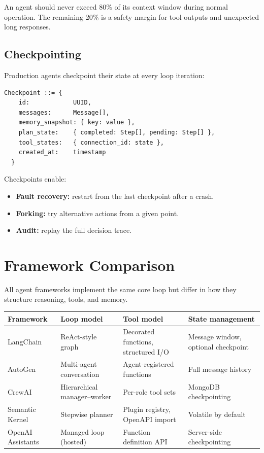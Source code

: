 \begin{principle}
	An agent should never exceed 80\% of its context window during normal operation. The remaining 20\% is a safety margin for tool outputs and unexpected long responses.
\end{principle}

\subsection{Checkpointing}

Production agents checkpoint their state at every loop iteration:

\begin{lstlisting}[caption=Agent checkpoint structure]
  Checkpoint ::= {
    id:            UUID,
    messages:      Message[],
    memory_snapshot: { key: value },
    plan_state:    { completed: Step[], pending: Step[] },
    tool_states:   { connection_id: state },
    created_at:    timestamp
  }
\end{lstlisting}

Checkpoints enable:
\begin{itemize}
	\item \textbf{Fault recovery:} restart from the last checkpoint after a crash.
	\item \textbf{Forking:} try alternative actions from a given point.
	\item \textbf{Audit:} replay the full decision trace.
\end{itemize}

\section{Framework Comparison}

All agent frameworks implement the same core loop but differ in how they structure reasoning, tools, and memory.

\begin{longtable}{p{2.5cm}p{3.5cm}p{3.5cm}p{3.5cm}}
	\toprule
	\textbf{Framework} & \textbf{Loop model}          & \textbf{Tool model}                 & \textbf{State management}           \\
	\midrule
	LangChain          & ReAct-style graph            & Decorated functions, structured I/O & Message window, optional checkpoint \\
	AutoGen            & Multi-agent conversation     & Agent-registered functions          & Full message history                \\
	CrewAI             & Hierarchical manager--worker & Per-role tool sets                  & MongoDB checkpointing               \\
	Semantic Kernel    & Stepwise planner             & Plugin registry, OpenAPI import     & Volatile by default                 \\
	OpenAI Assistants  & Managed loop (hosted)        & Function definition API             & Server-side checkpointing           \\
	\bottomrule
\end{longtable}

